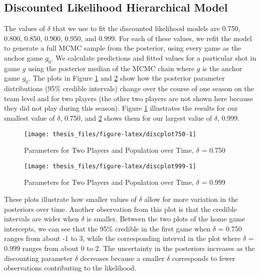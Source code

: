 \documentclass[12pt,twoside]{dukestatscithesis}
\theoremstyle{definition}
\theoremstyle{definition}
\theoremstyle{definition}
\theoremstyle{remark}
\begin{document}
\subsection{Discounted Likelihood Hierarchical
Model}\label{discounted-likelihood-hierarchical-model-1}

The values of \(\delta\) that we use to fit the discounted likelihood
models are 0.750, 0.800, 0.850, 0.900, 0.950, and 0.999. For each of
these values, we refit the model to generate a full MCMC sample from the
posterior, using every game as the anchor game \(g_0\). We calculate
predictions and fitted values for a particular shot in game \(g\) using
the posterior median of the MCMC chain where \(g\) is the anchor game
\(g_0\). The plots in Figure \ref{fig:discplot750} and
\ref{fig:discplot999} show how the posterior parameter distributions
(95\% credible intervals) change over the course of one season on the
team level and for two players (the other two players are not shown here
because they did not play during this season). Figure
\ref{fig:discplot750} illustrates the results for our smallest value of
\(\delta\), 0.750, and \ref{fig:discplot999} shows them for our largest
value of \(\delta\), 0.999.
\begin{figure}

{\centering \texttt{[image: thesis\_files/figure-latex/discplot750-1]} 

}

\caption{Parameters for Two Players and Population over Time, $\delta$ = 0.750}\label{fig:discplot750}
\end{figure}
\begin{figure}

{\centering \texttt{[image: thesis\_files/figure-latex/discplot999-1]} 

}

\caption{Parameters for Two Players and Population over Time, $\delta$ = 0.999}\label{fig:discplot999}
\end{figure}
These plots illustrate how smaller values of \(\delta\) allow for more
variation in the posteriors over time. Another observation from this
plot is that the credible intervals are wider when \(\delta\) is
smaller. Between the two plots of the home game intercepts, we can see
that the 95\% credible in the first game when \(\delta\) = 0.750 ranges
from about -1 to 3, while the corresponding interval in the plot where
\(\delta\) = 0.999 ranges from about 0 to 2. The uncertainty in the
posteriors increases as the discounting parameter \(\delta\) decreases
because a smaller \(\delta\) corresponds to fewer observations
contributing to the likelihood.
\end{document}
